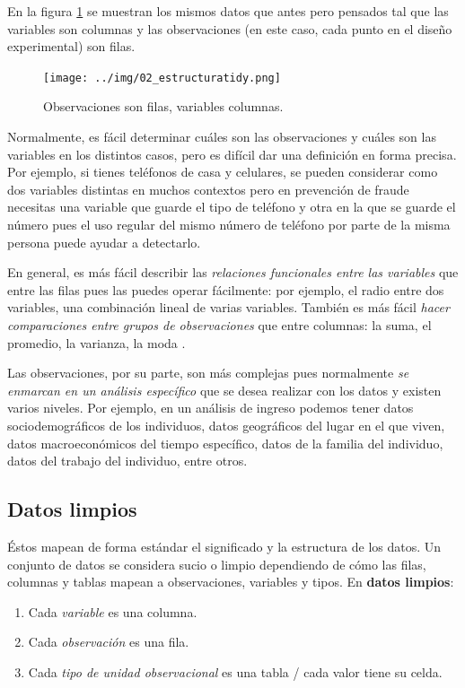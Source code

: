 \documentclass[]{article}
\providecommand{\tightlist}{%
  \setlength{\itemsep}{0pt}\setlength{\parskip}{0pt}}
\begin{document}
En la figura \ref{fig:estructuratidy} se muestran los mismos datos que
antes pero pensados tal que las variables son columnas y las
observaciones (en este caso, cada punto en el diseño experimental) son
filas.

\begin{figure}[h]
    \centering
    \texttt{[image: ../img/02\_estructuratidy.png]}
    \caption{Observaciones son filas, variables columnas.}
    \label{fig:estructuratidy}
\end{figure}

Normalmente, es fácil determinar cuáles son las observaciones y cuáles
son las variables en los distintos casos, pero es difícil dar una
definición en forma precisa. Por ejemplo, si tienes teléfonos de casa y
celulares, se pueden considerar como dos variables distintas en muchos
contextos pero en prevención de fraude necesitas una variable que guarde
el tipo de teléfono y otra en la que se guarde el número pues el uso
regular del mismo número de teléfono por parte de la misma persona puede
ayudar a detectarlo.

En general, es más fácil describir las \emph{relaciones funcionales
entre las variables} que entre las filas pues las puedes operar
fácilmente: por ejemplo, el radio entre dos variables, una combinación
lineal de varias variables. También es más fácil \emph{hacer
comparaciones entre grupos de observaciones} que entre columnas: la
suma, el promedio, la varianza, la moda
\parencite[][p. 4]{wickham2014tidy}.

Las observaciones, por su parte, son más complejas pues normalmente
\emph{se enmarcan en un análisis específico} que se desea realizar con
los datos y existen varios niveles. Por ejemplo, en un análisis de
ingreso podemos tener datos sociodemográficos de los individuos, datos
geográficos del lugar en el que viven, datos macroeconómicos del tiempo
específico, datos de la familia del individuo, datos del trabajo del
individuo, entre otros.

\subsection{Datos limpios}\label{datos-limpios-1}

Éstos mapean de forma estándar el significado y la estructura de los
datos. Un conjunto de datos se considera sucio o limpio dependiendo de
cómo las filas, columnas y tablas mapean a observaciones, variables y
tipos. En \textbf{datos limpios}:

\begin{enumerate}
\def\labelenumi{\arabic{enumi}.}
\tightlist
\item
  Cada \emph{variable} es una columna.
\item
  Cada \emph{observación} es una fila.
\item
  Cada \emph{tipo de unidad observacional} es una tabla / cada valor
  tiene su celda.
\end{enumerate}
\end{document}
